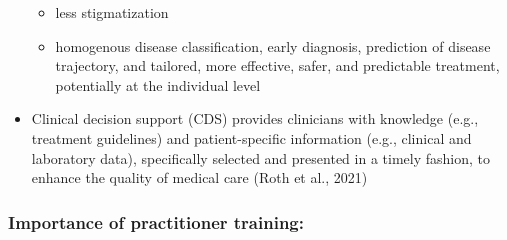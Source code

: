 \documentclass[
  man]{apa7}
\providecommand{\tightlist}{%
  \setlength{\itemsep}{0pt}\setlength{\parskip}{0pt}}
\begin{document}
\begin{itemize}
  \begin{itemize}
  \tightlist
  \item
    less stigmatization
  \item
    homogenous disease classification, early diagnosis, prediction of disease trajectory, and tailored, more effective, safer, and predictable treatment, potentially at the individual level
  \end{itemize}
\item
  Clinical decision support (CDS) provides clinicians with knowledge (e.g., treatment guidelines) and patient-specific information (e.g., clinical and laboratory data), specifically selected and presented in a timely fashion, to enhance the quality of medical care (Roth et al., 2021)
\end{itemize}

\hypertarget{importance-of-practitioner-training}{%
\subsubsection{Importance of practitioner training:}\label{importance-of-practitioner-training}}
\end{document}
